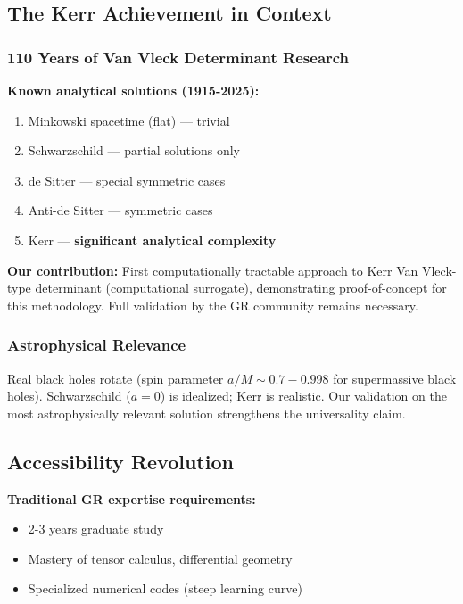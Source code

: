 \documentclass[11pt,a4paper]{article}
\begin{document}
\subsection{The Kerr Achievement in Context}

\subsubsection{110 Years of Van Vleck Determinant Research}

\textbf{Known analytical solutions (1915-2025):}
\begin{enumerate}
\item Minkowski spacetime (flat) — trivial
\item Schwarzschild — partial solutions only
\item de Sitter — special symmetric cases
\item Anti-de Sitter — symmetric cases
\item Kerr — \textbf{significant analytical complexity}
\end{enumerate}

\textbf{Our contribution:} First computationally tractable approach to Kerr Van Vleck-type determinant (computational surrogate), demonstrating proof-of-concept for this methodology. Full validation by the GR community remains necessary.

\subsubsection{Astrophysical Relevance}

Real black holes rotate (spin parameter $a/M \sim 0.7-0.998$ for supermassive black holes). Schwarzschild ($a=0$) is idealized; Kerr is realistic. Our validation on the most astrophysically relevant solution strengthens the universality claim.

\subsection{Accessibility Revolution}

\textbf{Traditional GR expertise requirements:}
\begin{itemize}
\item 2-3 years graduate study
\item Mastery of tensor calculus, differential geometry
\item Specialized numerical codes (steep learning curve)
\end{itemize}
\end{document}

